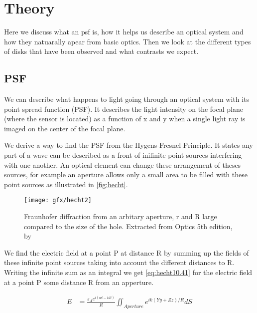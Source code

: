 
\chapter{Theory} %
\label{ch:theory} %
Here we discuss what an psf is, how it helps us describe an optical system and how they natuarally apear from basic optics. Then we look at the different types of disks that have been observed and what contrasts we expect.
\section{PSF}
\label{sec:PSF}

We can describe what happens to light going through an optical system with its point spread function (PSF). It describes the light intensity on the focal plane (where the sensor is located) as a function of x and y when a single light ray is imaged on the center of the focal plane. 

We derive a way to find the PSF from the Hygens-Fresnel Principle. It states any part of a wave can be described as a front of inifinite point sources interfering with one another. An optical element can change these arrangement of theses sources, for example an aperture allows only a small area to be filled with these point sources as illustrated in \autoref{fig:hecht}. 

\begin{figure}[h]
    \caption{Fraunhofer diffraction from an arbitary aperture, r and R large compared to the size of the hole. Extracted from Optics 5th edition, by \cite{hecht}}
    \centering
    \texttt{[image: gfx/hecht2]}
    \label{fig:hecht}
\end{figure}

We find the electric field at a point P at distance R by summing up the fields of these infinite point sources taking into account the different distances to R. Writing the infinite sum as an integral we get \autoref{eq:hecht10.41} for the electric field at a point P some distance R from an apperture.

\begin{subequations}
    \begin{align}
        E &= \frac{\varepsilon_A e^{i(wt-kR)}}{R} \iint_{Aperture} e^{ik(Yy+Zz)/R} dS
    \end{align}
    \label{eq:hecht10.41}
\end{subequations}

